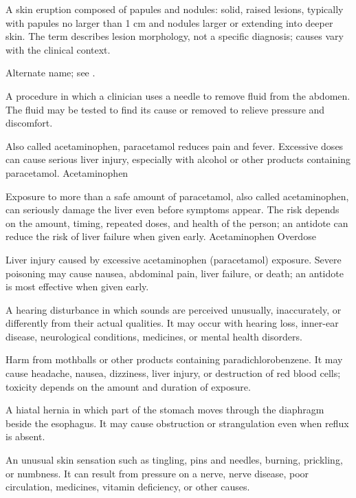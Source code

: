  A skin eruption composed of papules and nodules: solid, raised lesions, typically with papules no larger than 1 cm and nodules larger or extending into deeper skin. The term describes lesion morphology, not a specific diagnosis; causes vary with the clinical context.

 Alternate name; see .

 A procedure in which a clinician uses a needle to remove fluid from the abdomen. The fluid may be tested to find its cause or removed to relieve pressure and discomfort.

 Also called acetaminophen, paracetamol reduces pain and fever. Excessive doses can cause serious liver injury, especially with alcohol or other products containing paracetamol.
\synonyms
Acetaminophen

 Exposure to more than a safe amount of paracetamol, also called acetaminophen, can seriously damage the liver even before symptoms appear. The risk depends on the amount, timing, repeated doses, and health of the person; an antidote can reduce the risk of liver failure when given early.
\synonyms
Acetaminophen Overdose

 Liver injury caused by excessive acetaminophen (paracetamol) exposure. Severe poisoning may
cause nausea, abdominal pain, liver failure, or death; an antidote is most effective when given early.

 A hearing disturbance in which sounds are perceived unusually, inaccurately, or differently from their actual qualities. It may occur with hearing loss, inner-ear disease, neurological conditions, medicines, or mental health disorders.

 Harm from mothballs or other products containing paradichlorobenzene. It may cause headache, nausea, dizziness, liver injury, or destruction of red blood cells; toxicity depends on the amount and duration of exposure.

 A hiatal hernia in which part of the stomach moves through the diaphragm beside the esophagus.
It may cause obstruction or strangulation even when reflux is absent.

 An unusual skin sensation such as tingling, pins and needles, burning, prickling, or numbness. It can result from pressure on a nerve, nerve disease, poor circulation, medicines, vitamin deficiency, or other causes.

